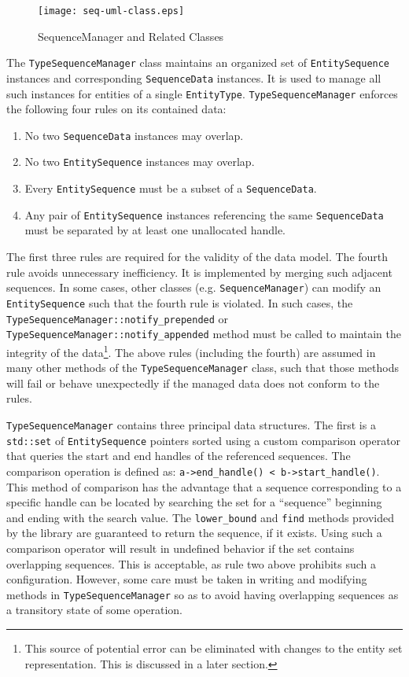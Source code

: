 \documentclass{report}
\begin{document}
\begin{figure*}[htbp]
\begin{center}
\texttt{[image: seq-uml-class.eps]}
\caption{SequenceManager and Related Classes}
\end{center}
\end{figure*}

The \texttt{TypeSequenceManager} class maintains an organized set of \texttt{EntitySequence} instances and corresponding \texttt{SequenceData} instances. It is used to manage all such instances for entities of a single \texttt{EntityType}.  \texttt{TypeSequenceManager} enforces the following four rules on its contained data:
\begin{enumerate}
\item No two \texttt{SequenceData} instances may overlap.
\item No two \texttt{EntitySequence} instances may overlap.
\item Every \texttt{EntitySequence} must be a subset of a \texttt{SequenceData}.
\item Any pair of \texttt{EntitySequence} instances referencing the same \texttt{SequenceData} must be separated by at least one unallocated handle.
\end{enumerate}

The first three rules are required for the validity of the data model.  The fourth rule avoids unnecessary inefficiency.  It is implemented by merging such adjacent sequences.  In some cases, other classes (e.g. \texttt{SequenceManager}) can modify an \texttt{EntitySequence} such that the fourth rule is violated.  In such cases, the \texttt{TypeSequenceManager::notify\_prepended} or \texttt{TypeSequenceManager::notify\_appended} method must be called to maintain the integrity of the data\footnote{This source of potential error can be eliminated with changes to the entity set representation.  This is discussed in a later section.}.  The above rules (including the fourth) are assumed in many other methods of the \texttt{TypeSequenceManager} class, such that those methods will fail or behave unexpectedly if the managed data does not conform to the rules.

\texttt{TypeSequenceManager} contains three principal data structures.  The first is a \texttt{std::set} of \texttt{EntitySequence} pointers sorted using a custom comparison operator that queries the start and end handles of the referenced sequences.  The comparison operation is defined as: \verb|a->end_handle() < b->start_handle()|. This method of comparison has the advantage that a sequence corresponding to a specific handle can be located by searching the set for a ``sequence'' beginning and ending with the search value.  The \texttt{lower\_bound} and \texttt{find} methods provided by the library are guaranteed to return the sequence, if it exists.  Using such a comparison operator will result in undefined behavior if the set contains overlapping sequences.  This is acceptable, as rule two above prohibits such a configuration.  However, some care must be taken in writing and modifying methods in \texttt{TypeSequenceManager} so as to avoid having overlapping sequences as a transitory state of some operation.
\end{document}
